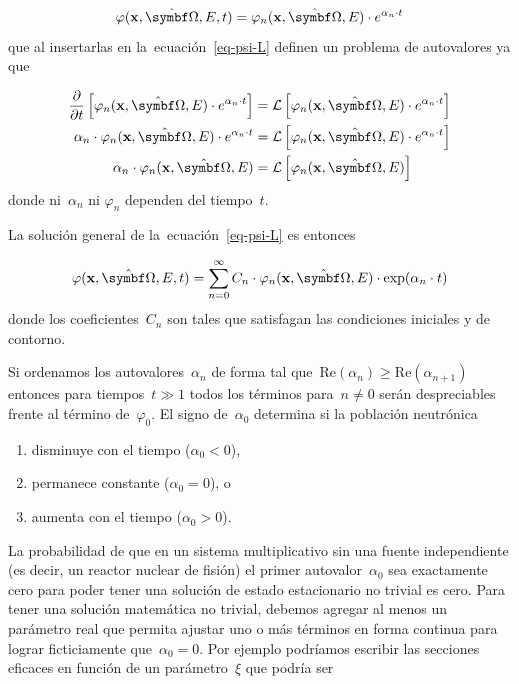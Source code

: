 \documentclass[
  12pt,
  a4paper,
  table]{scrbook}
\providecommand{\tightlist}{%
  \setlength{\itemsep}{0pt}\setlength{\parskip}{0pt}}\usepackage{longtable,booktabs,array}
\theoremstyle{plain}
\theoremstyle{definition}
\theoremstyle{plain}
\theoremstyle{plain}
\theoremstyle{remark}
\begin{document}
\[
\varphi(\vec{x},\omegaversor, E,t) = \varphi_n(\vec{x},\omegaversor, E) \cdot e^{\alpha_n \cdot t}
\] que al insertarlas en la~ecuación~\ref{eq-psi-L} definen un problema
de autovalores ya que

\[
\begin{aligned}
\frac{\partial}{\partial t} \left[ \varphi_n(\vec{x},\omegaversor, E) \cdot e^{\alpha_n \cdot t} \right] 
&=
\mathcal{L}\left[\varphi_n(\vec{x},\omegaversor, E) \cdot e^{\alpha_n\cdot t} \right] \\
\alpha_n \cdot \varphi_n(\vec{x},\omegaversor, E) \cdot e^{\alpha_n\cdot t}
&=
\mathcal{L}\left[\varphi_n(\vec{x},\omegaversor, E) \cdot e^{\alpha_n\cdot t} \right] \\
\alpha_n \cdot \varphi_n(\vec{x},\omegaversor, E)
&=
\mathcal{L}\left[\varphi_n(\vec{x},\omegaversor, E)\right]
\end{aligned}
\] donde ni~\(\alpha_n\) ni \(\varphi_n\) dependen del tiempo~\(t\).

La solución general de la~ecuación~\ref{eq-psi-L} es entonces

\[
\varphi(\vec{x},\omegaversor, E,t) = \sum_{n=0}^\infty C_n \cdot \varphi_n(\vec{x},\omegaversor,E) \cdot \exp(\alpha_n \cdot t)
\] donde los coeficientes~\(C_n\) son tales que satisfagan las
condiciones iniciales y de contorno.

Si ordenamos los autovalores~\(\alpha_n\) de forma tal
que~\(\text{Re}(\alpha_n) \ge \text{Re}(\alpha_{n+1})\) entonces para
tiempos~\(t\gg 1\) todos los términos para~\(n \neq 0\) serán
despreciables frente al término de~\(\varphi_0\). El signo
de~\(\alpha_0\) determina si la población neutrónica

\begin{enumerate}
\def\labelenumi{\alph{enumi}.}
\tightlist
\item
  disminuye con el tiempo (\(\alpha_0 < 0\)),
\item
  permanece constante (\(\alpha_0 = 0\)), o
\item
  aumenta con el tiempo (\(\alpha_0 > 0\)).
\end{enumerate}

La probabilidad de que en un sistema multiplicativo sin una fuente
independiente (es decir, un reactor nuclear de fisión) el primer
autovalor~\(\alpha_0\) sea exactamente cero para poder tener una
solución de estado estacionario no trivial es cero. Para tener una
solución matemática no trivial, debemos agregar al menos un parámetro
real que permita ajustar uno o más términos en forma continua para
lograr ficticiamente que~\(\alpha_0 = 0\). Por ejemplo podríamos
escribir las secciones eficaces en función de un parámetro~\(\xi\) que
podría ser
\end{document}
